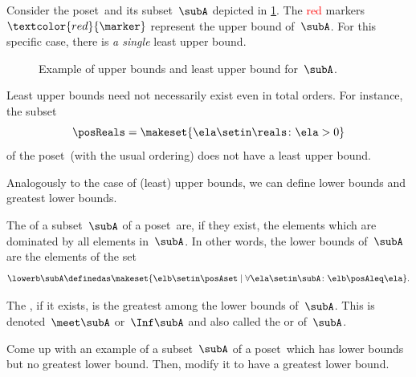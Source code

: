 \begin{example}
    Consider the poset~\posA and its subset~$\subA$ depicted in \cref{fig:upper_bound_example_bis}.
    The \textcolor{red}{red} markers~$\textcolor{red}{\marker}$ represent the upper bound of~$\subA$.
    For this specific case, there is \emph{a single} least upper bound.
\end{example}

\begin{figure}[h!]
    \caption{Example of upper bounds and least upper bound for~$\subA$.}
    \label{fig:upper_bound_example_bis}
\end{figure}
\begin{example}
    Least upper bounds need not necessarily exist even in total orders.
    For instance, the subset
    \begin{equation}
        \posReals = \makeset{\ela \setin \reals \colon \ela>0}
    \end{equation}
    of the poset~\reals (with the usual ordering) does not have a least upper bound.
\end{example}

Analogously to the case of (least) upper bounds, we can define lower bounds and greatest lower bounds.

\begin{ctdefinition}
    \label{def:greatest-lower-bound}
    \label{def:lower-bounds}
    The  of a subset~$\subA$ of a poset~\posA are, if they exist, the elements which are dominated by all elements in~$\subA$.
    In other words, the lower bounds of~$\subA$ are the elements of the set
    \begin{equation}
        \lowerb \subA\definedas \makeset{ \elb \setin \posAset \mid \forall \ela \setin \subA \colon \elb \posAleq \ela }.
    \end{equation}
\end{ctdefinition}

\begin{ctdefinition}\label{def:infimum}
    The , if it exists, is the greatest among the lower bounds of~$\subA$.
    This is denoted~$\meet \subA$ or~$\Inf \subA$ and also called the  or  of~$\subA$.
\end{ctdefinition}

\begin{exercise}
    Come up with an example of a subset~$\subA$ of a poset~\posA which has lower bounds but no greatest lower bound.
    Then, modify it to have a greatest lower bound.
\end{exercise}


